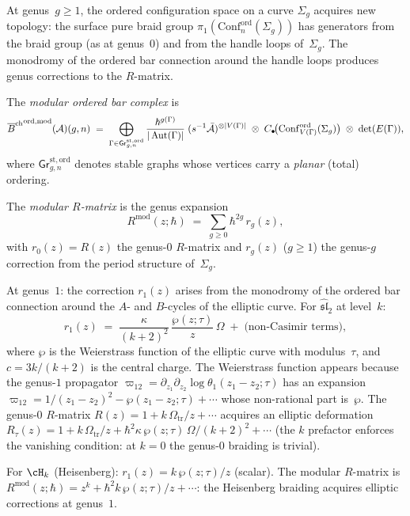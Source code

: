 \begin{construction}
\label{constr:modular-ordered-bar}
At genus~$g\ge 1$, the ordered configuration space on a curve
$\Sigma_g$ acquires new topology: the surface pure braid group
$\pi_1(\mathrm{Conf}_n^{\mathrm{ord}}(\Sigma_g))$ has generators
from the braid group (as at genus~$0$) and from the handle
loops of~$\Sigma_g$. The monodromy of the ordered bar connection
around the handle loops produces genus corrections to the
$R$-matrix.

The \emph{modular ordered bar complex} is
\[
{\overline{B}^{\mathrm{ch}}}^{\mathrm{ord,mod}}(\mathcal{A})(g,n)
\;=\;
\bigoplus_{\Gamma\in\mathsf{Gr}^{\mathrm{st,ord}}_{g,n}}
\frac{\hbar^{g(\Gamma)}}{|\operatorname{Aut}(\Gamma)|}
\;(s^{-1}\bar{\mathcal{A}})^{\otimes|V(\Gamma)|}
\;\otimes\;
C_\bullet\!\bigl(
\mathrm{Conf}^{\mathrm{ord}}_{V(\Gamma)}(\Sigma_g)\bigr)
\;\otimes\;\det(E(\Gamma)),
\]
where $\mathsf{Gr}^{\mathrm{st,ord}}_{g,n}$ denotes stable
graphs whose vertices carry a \emph{planar} (total) ordering.

The \emph{modular $R$-matrix} is the genus expansion
\begin{equation}\label{eq:modular-r-matrix}
R^{\mathrm{mod}}(z;\hbar)
\;=\;
\sum_{g\ge 0}\hbar^{2g}\,r_g(z),
\end{equation}
with $r_0(z)=R(z)$ the genus-$0$ $R$-matrix and $r_g(z)$
($g\ge 1$) the genus-$g$ correction from the period structure
of~$\Sigma_g$.

At genus~$1$: the correction $r_1(z)$ arises from the monodromy
of the ordered bar connection around the $A$- and $B$-cycles
of the elliptic curve. For
$\widehat{\mathfrak{sl}}_2$ at level~$k$:
\[
r_1(z)
\;=\;
\frac{\kappa}{(k+2)^2}\,
\frac{\wp(z;\tau)}{z}\,\Omega
\;+\;\text{(non-Casimir terms)},
\]
where $\wp$ is the Weierstrass function of the elliptic
curve with modulus~$\tau$, and $c=3k/(k+2)$ is the central charge.
The Weierstrass function appears because the genus-$1$
propagator $\varpi_{12}=\partial_{z_1}\partial_{z_2}\log
\theta_1(z_1-z_2;\tau)$ has an expansion
$\varpi_{12}=1/(z_1-z_2)^2-\wp(z_1-z_2;\tau)+\cdots$
whose non-rational part is~$\wp$. The genus-$0$
$R$-matrix $R(z)=1+k\,\Omega_{\mathrm{tr}}/z+\cdots$ acquires an
elliptic deformation $R_\tau(z)=1+k\,\Omega_{\mathrm{tr}}/z
+\hbar^2\kappa\,\wp(z;\tau)\,\Omega/(k+2)^2+\cdots$
(the $k$ prefactor enforces the vanishing condition: at $k=0$ the
genus-$0$ braiding is trivial).

For $\cH_k$ (Heisenberg): $r_1(z)=k\,\wp(z;\tau)/z$
(scalar). The modular $R$-matrix is
$R^{\mathrm{mod}}(z;\hbar)=z^k+\hbar^2 k\,\wp(z;\tau)/z+\cdots$:
the Heisenberg braiding acquires elliptic corrections at genus~$1$.
\end{construction}

